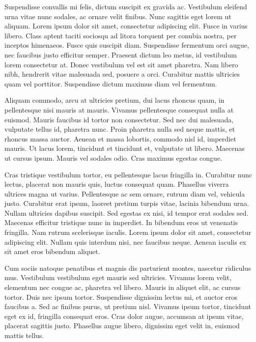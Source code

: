 Suspendisse convallis mi felis, dictum suscipit ex gravida ac. Vestibulum eleifend urna vitae nunc sodales, ac ornare velit finibus. Nunc sagittis eget lorem ut aliquam. Lorem ipsum dolor sit amet, consectetur adipiscing elit. Fusce in varius libero. Class aptent taciti sociosqu ad litora torquent per conubia nostra, per inceptos himenaeos. Fusce quis suscipit diam. Suspendisse fermentum orci augue, nec faucibus justo efficitur semper. Praesent dictum leo metus, id vestibulum lorem consectetur at. Donec vestibulum vel est sit amet pharetra. Nam libero nibh, hendrerit vitae malesuada sed, posuere a orci. Curabitur mattis ultricies quam vel porttitor. Suspendisse dictum maximus diam vel fermentum.

Aliquam commodo, arcu at ultricies pretium, dui lacus rhoncus quam, in pellentesque nisi mauris at mauris. Vivamus pellentesque consequat nulla at euismod. Mauris faucibus id tortor non consectetur. Sed nec dui malesuada, vulputate tellus id, pharetra nunc. Proin pharetra nulla sed neque mattis, et rhoncus massa auctor. Aenean et massa lobortis, commodo nisl id, imperdiet mauris. Ut lacus lorem, tincidunt et tincidunt et, vulputate ut libero. Maecenas ut cursus ipsum. Mauris vel sodales odio. Cras maximus egestas congue.

Cras tristique vestibulum tortor, eu pellentesque lacus fringilla in. Curabitur nunc lectus, placerat non mauris quis, luctus consequat quam. Phasellus viverra ultrices magna ut varius. Pellentesque ac sem ornare, rutrum diam vel, vehicula justo. Curabitur erat ipsum, laoreet pretium turpis vitae, lacinia bibendum urna. Nullam ultricies dapibus suscipit. Sed egestas ex nisi, id tempor erat sodales sed. Maecenas efficitur tristique nunc in imperdiet. In bibendum eros ut venenatis fringilla. Nam rutrum scelerisque iaculis. Lorem ipsum dolor sit amet, consectetur adipiscing elit. Nullam quis interdum nisi, nec faucibus neque. Aenean iaculis ex sit amet eros bibendum aliquet.

Cum sociis natoque penatibus et magnis dis parturient montes, nascetur ridiculus mus. Vestibulum vestibulum eget mauris sed ultricies. Vivamus lorem velit, elementum nec congue ac, pharetra vel libero. Mauris in aliquet elit, ac cursus tortor. Duis nec ipsum tortor. Suspendisse dignissim lectus mi, et auctor eros faucibus a. Sed ac finibus purus, ut pretium nisl. Vivamus ipsum tortor, tincidunt eget ex id, fringilla consequat eros. Cras dolor augue, accumsan at ipsum vitae, placerat sagittis justo. Phasellus augue libero, dignissim eget velit in, euismod mattis tellus.

